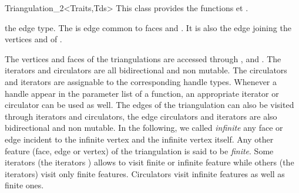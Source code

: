 \begin{ccRefClass}{Triangulation_2<Traits,Tds>}
This class provides the functions  et .

\ccTypes
{}
\ccThreeToTwo

\ccGlue
{}

\ccGlue
{}
\ccGlue
{}

\ccGlue
{}
\ccGlue
{}
 {the edge type.
The  is edge common to faces  and 
. It is also the edge joining the vertices
 and  of .}


\ccThreeToTwo
The vertices and faces of the triangulations are accessed through 
, 
 and . 
The iterators and circulators
are all bidirectional and non mutable.
The circulators and iterators are assignable to the 
corresponding handle types. Whenever a handle appear in the parameter 
list of a function, an appropriate iterator or circulator can be used as well.
The edges of the triangulation can also be visited through iterators
and circulators,
the edge circulators and iterators
are also bidirectional and non mutable.
In the following, we called {\it infinite} any face or edge 
incident  to the infinite vertex and the infinite vertex itself.
 Any other feature (face, edge or vertex) of the triangulation is said 
to be {\it finite}.
Some iterators (the  iterators ) allows to visit finite or 
infinite feature while others (the  iterators) visit only
finite features. Circulators visit infinite features as well as finite 
ones.

\ccGlue
{}


\ccGlue
{}
\ccGlue
{}


\end{ccRefClass}
